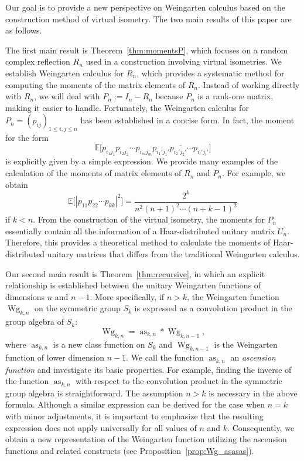 \documentclass[10pt,a4paper]{amsart}
\numberwithin{equation}{section}
\theoremstyle{definition}
\DeclareMathOperator{\Raise}{as}
\DeclareMathOperator{\Wg}{Wg}
\begin{document}
Our goal is to provide a new perspective on Weingarten calculus based on the construction method of virtual isometry.
The two main results of this paper are as follows.

The first main result is Theorem~\ref{thm:momentsP}, which focuses on a random complex reflection $R_n$ used in a construction involving virtual isometries.
We establish Weingarten calculus for $R_n$, which provides a systematic method for computing the moments of the matrix elements of $R_n$.
Instead of working directly with $R_n$,
we will deal with $P_n:=I_n-R_n$ because $P_n$ is a rank-one matrix, making it easier to handle.
Fortunately, the Weingarten calculus for $P_n=(p_{ij})_{1 \le i,j \le n}$ has been established in a concise form.
In fact, the moment for the form
\[
\mathbb{E} \bigl[ p_{i_1 j_1} p_{i_2 j_2} \cdots p_{i_m j_m}
\overline{p_{i_1' j_1'} p_{i_2' j_2'} \cdots p_{i_l' j_l'}}
\bigr]
\]
is explicitly given by a simple expression.
We provide many examples of the calculation of the moments of matrix elements of $R_n$ and $P_n$.
For example, we obtain
\[
\mathbb{E} \bigl[|p_{11} p_{22} \cdots p_{kk}|^2\bigr] = \frac{2^k}{n^2(n+1)^2 \cdots (n+k-1)^2}
\]
if $k<n$.
From the construction of the virtual isometry, the moments for $P_n$ essentially contain all the information of a Haar-distributed unitary matrix $U_n$.
Therefore, this provides a theoretical method to calculate the moments of Haar-distributed unitary matrices that differs from the traditional Weingarten calculus.

Our second main result is Theorem~\ref{thm:recursive}, in which an explicit relationship is established between the unitary Weingarten functions of dimensions $n$ and $n-1$.
More specifically, if $n >k$, the Weingarten function $\Wg_{k,n}$ on the symmetric group $S_k$ is expressed as a convolution product in the group algebra of $S_k$:
\[
\Wg_{k,n}= \Raise_{k,n} * \Wg_{k,n-1},
\]
where $\Raise_{k,n}$ is a new class function on $S_k$ and $\Wg_{k,n-1}$ is the Weingarten function of lower dimension $n-1$.
We call the function $\Raise_{k,n}$ an \emph{ascension function} and investigate its basic properties.
For example, finding the inverse of the function $\Raise_{k,n}$ with respect to the convolution product in the symmetric group algebra is straightforward.
The assumption $n > k$ is necessary in the above formula. Although a similar expression can be derived for the case when $ n = k $ with minor adjustments, it is important to emphasize that the resulting expression does not apply universally for all values of $ n $ and $ k $. Consequently, we obtain a new representation of the Weingarten function utilizing the ascension functions and related constructs (see Proposition~\ref{prop:Wg_asasas}).
\end{document}

